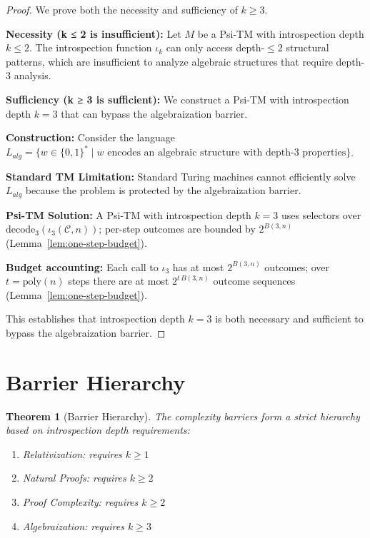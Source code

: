 \documentclass[11pt]{article}
\newtheorem{theorem}{Theorem}
\begin{document}
\begin{proof}
We prove both the necessity and sufficiency of $k \geq 3$.

\textbf{Necessity (k ≤ 2 is insufficient):}
Let $M$ be a Psi-TM with introspection depth $k \leq 2$. The introspection function $\iota_k$ can only access depth-$\leq$2 structural patterns, which are insufficient to analyze algebraic structures that require depth-3 analysis.

\textbf{Sufficiency (k ≥ 3 is sufficient):}
We construct a Psi-TM with introspection depth $k = 3$ that can bypass the algebraization barrier.

\textbf{Construction:}
Consider the language $L_{alg} = \{w \in \{0,1\}^* \mid w \text{ encodes an algebraic structure with depth-3 properties}\}$.

\textbf{Standard TM Limitation:}
Standard Turing machines cannot efficiently solve $L_{alg}$ because the problem is protected by the algebraization barrier.

\textbf{Psi-TM Solution:}
A Psi-TM with introspection depth $k = 3$ uses selectors over $\mathrm{decode}_3(\iota_3(\mathcal{C},n))$; per-step outcomes are bounded by $2^{B(3,n)}$ (Lemma~\ref{lem:one-step-budget}).

\textbf{Budget accounting:}
Each call to $\iota_3$ has at most $2^{B(3,n)}$ outcomes; over $t=\mathrm{poly}(n)$ steps there are at most $2^{t\,B(3,n)}$ outcome sequences (Lemma~\ref{lem:one-step-budget}).

This establishes that introspection depth $k = 3$ is both necessary and sufficient to bypass the algebraization barrier.
\end{proof}

\section{Barrier Hierarchy}

\begin{theorem}[Barrier Hierarchy]
The complexity barriers form a strict hierarchy based on introspection depth requirements:
\begin{enumerate}
\item Relativization: requires $k \geq 1$
\item Natural Proofs: requires $k \geq 2$
\item Proof Complexity: requires $k \geq 2$
\item Algebraization: requires $k \geq 3$
\end{enumerate}
\end{theorem}
\end{document}
